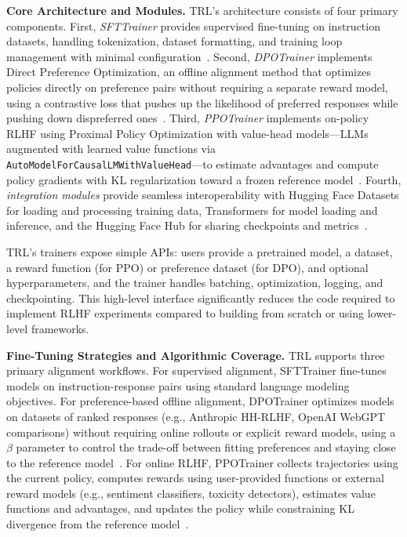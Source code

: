 \documentclass[conference]{IEEEtran}
\begin{document}
\textbf{Core Architecture and Modules.} TRL's architecture consists of four primary components. First, \textit{SFTTrainer} provides supervised fine-tuning on instruction datasets, handling tokenization, dataset formatting, and training loop management with minimal configuration~\cite{trl-github}. Second, \textit{DPOTrainer} implements Direct Preference Optimization, an offline alignment method that optimizes policies directly on preference pairs without requiring a separate reward model, using a contrastive loss that pushes up the likelihood of preferred responses while pushing down dispreferred ones~\cite{dpo-paper, trl-github}. Third, \textit{PPOTrainer} implements on-policy RLHF using Proximal Policy Optimization with value-head models—LLMs augmented with learned value functions via \texttt{AutoModelForCausalLMWithValueHead}—to estimate advantages and compute policy gradients with KL regularization toward a frozen reference model~\cite{trl-github}. Fourth, \textit{integration modules} provide seamless interoperability with Hugging Face Datasets for loading and processing training data, Transformers for model loading and inference, and the Hugging Face Hub for sharing checkpoints and metrics~\cite{trl-github}.

TRL's trainers expose simple APIs: users provide a pretrained model, a dataset, a reward function (for PPO) or preference dataset (for DPO), and optional hyperparameters, and the trainer handles batching, optimization, logging, and checkpointing. This high-level interface significantly reduces the code required to implement RLHF experiments compared to building from scratch or using lower-level frameworks.

\textbf{Fine-Tuning Strategies and Algorithmic Coverage.} TRL supports three primary alignment workflows. For supervised alignment, SFTTrainer fine-tunes models on instruction-response pairs using standard language modeling objectives. For preference-based offline alignment, DPOTrainer optimizes models on datasets of ranked responses (e.g., Anthropic HH-RLHF, OpenAI WebGPT comparisons) without requiring online rollouts or explicit reward models, using a $\beta$ parameter to control the trade-off between fitting preferences and staying close to the reference model~\cite{dpo-paper}. For online RLHF, PPOTrainer collects trajectories using the current policy, computes rewards using user-provided functions or external reward models (e.g., sentiment classifiers, toxicity detectors), estimates value functions and advantages, and updates the policy while constraining KL divergence from the reference model~\cite{trl-github}.
\end{document}
